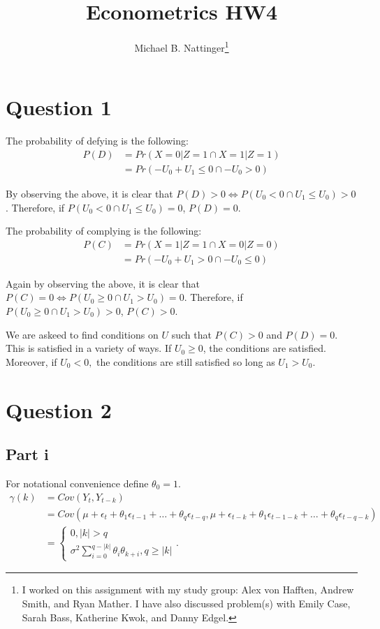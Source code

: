 \documentclass[11pt]{article} %
\title{Econometrics HW4}
\author{Michael B. Nattinger\footnote{I worked on this assignment with my study group: Alex von Hafften, Andrew Smith, and Ryan Mather. I have also discussed problem(s) with Emily Case, Sarah Bass, Katherine Kwok, and Danny Edgel.}}
\begin{document}
\maketitle

\section{Question 1}
The probability of defying is the following:
\begin{align*}
P(D) &= Pr(X=0 | Z=1 \cap X=1 |Z=1)\\
&=Pr(-U_0 +U_1 \leq 0 \cap -U_0 > 0)
\end{align*}

By observing the above, it is clear that $P(D) > 0 \iff P( U_0<0 \cap U_1\leq U_0)>0$. Therefore, if $ P( U_0<0 \cap U_1 \leq U_0) = 0$, $P(D) = 0.$ 

The probability of complying is the following:
\begin{align*}
P(C) &= Pr(X=1 | Z=1 \cap X=0 |Z=0)\\
&= Pr(-U_0 +U_1 >0 \cap -U_0 \leq 0)
\end{align*}

Again by observing the above, it is clear that $P(C) = 0 \iff P(U_0\geq 0 \cap U_1>U_0) = 0$. Therefore, if $ P(U_0\geq 0 \cap U_1>U_0) > 0$, $P(C) > 0.$

We are askeed to find conditions on $U$ such that $P(C)>0$ and $P(D) = 0.$ This is satisfied in a variety of ways. If $U_0 \geq 0$, the conditions are satisfied. Moreover, if $U_0<0,$ the conditions are still satisfied so long as $U_1>U_0$.
\section{Question 2}
\subsection{Part i}
For notational convenience define $\theta_0 = 1$. 
\begin{align*}
\gamma (k) &= Cov(Y_t,Y_{t-k}) \\
&= Cov(\mu + \epsilon_t + \theta_1\epsilon_{t-1} + \dots + \theta_q \epsilon_{t-q},\mu + \epsilon_{t-k} + \theta_1\epsilon_{t-1 - k} + \dots + \theta_q \epsilon_{t-q-k})\\
&= \begin{cases}
0, |k|>q\\
\sigma^2 \sum_{i=0}^{q - |k|}\theta_i \theta_{k+i}, q\geq |k|
\end{cases}.
\end{align*}
\end{document}
